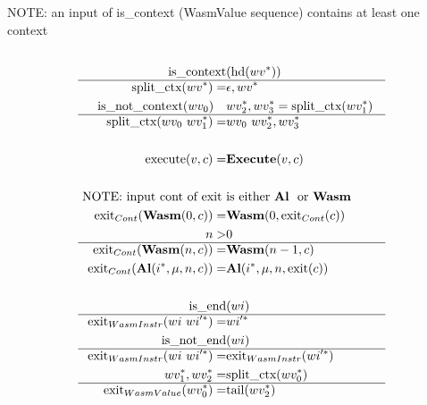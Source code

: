 NOTE: an input of is\_context (WasmValue sequence) contains at least one context
\begin{align*}
%
\newline \\
  \text{is\_context}&(\text{hd}(\seq{wv})) \\
  \hline
  \text{split\_ctx}(\seq{wv}) =& \epsilon, \seq{wv} \\
%
  \text{is\_not\_context}(wv_0) \quad& \seq{wv_2}, \seq{wv_3} = \text{split\_ctx}(\seq{wv_1}) \\
  \hline
  \text{split\_ctx}(wv_0 ~ \seq{wv_1}) =& wv_0 ~ \seq{wv_2}, \seq{wv_3} \\
%
\newline \\
  \text{execute}(v, c) =& \exe(v, c) \\
%
\newline \\
\text{
  NOTE: input cont of exit }&\text{is either \al ~ or \wasm
} \\
  \text{exit}_{Cont}(\wasm (0, c)) =& \wasm(0, \text{exit}_{Cont}(c)) \\
%
  n >& 0 \\
  \hline
  \text{exit}_{Cont}(\wasm (n, c)) =& \wasm(n-1, c) \\
%
  \text{exit}_{Cont}(\al (\seq i, \mu, n, c)) =& \al (\seq i, \mu, n, \text{exit}(c)) \\
%
\newline \\
  \text{is\_end}&(wi) \\
  \hline
  \text{exit}_{WasmInstr}(wi ~ \seq{wi'}) =& \seq{wi'} \\
%
  \text{is\_not\_end}&(wi) \\
  \hline
  \text{exit}_{WasmInstr}(wi ~ \seq{wi'}) =& \text{exit}_{WasmInstr}(\seq{wi'}) \\
%
  \seq{wv_1}, \seq{wv_2} =& \text{split\_ctx}(\seq{wv_0}) \\
  \hline
  \text{exit}_{WasmValue}(\seq{wv_0}) =& \text{tail}(\seq{wv_2}) \\
\end{align*}





